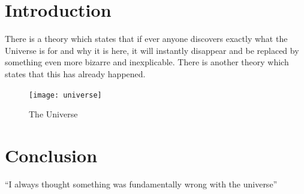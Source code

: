 \documentclass[11pt, a4paper]{report}
\begin{document}
\tableofcontents
\newpage

\section*{Introduction}
There is a theory which states that if ever anyone discovers exactly what the Universe is for and why it is here, it will instantly disappear and be replaced by something even more bizarre and inexplicable.
There is another theory which states that this has already happened.

\begin{figure}[h!]
\centering
\texttt{[image: universe]}
\caption{The Universe}
\label{fig:universe}
\end{figure}

\section*{Conclusion}
``I always thought something was fundamentally wrong with the universe'' \citep{adams1995hitchhiker}



\end{document}
